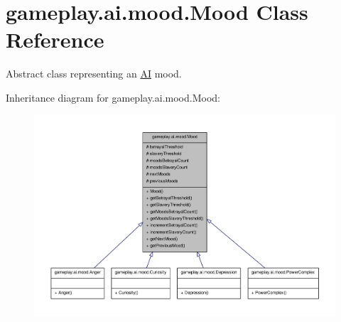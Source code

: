\hypertarget{a00015}{\section{gameplay.\-ai.\-mood.\-Mood Class Reference}
\label{a00015}
}


Abstract class representing an \hyperlink{a00001}{A\-I} mood.  




Inheritance diagram for gameplay.\-ai.\-mood.\-Mood\-:
\nopagebreak
\begin{figure}[H]
\begin{center}
\leavevmode
\includegraphics[width=350pt]{a00110}
\end{center}
\end{figure}



